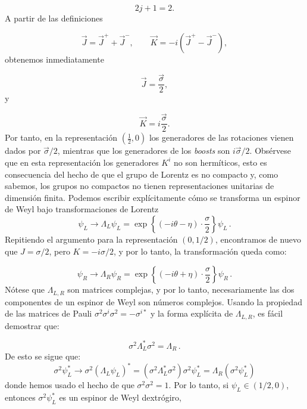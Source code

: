 \documentclass[a4paper,11pt]{book} %
\begin{document}
\begin{equation}
2j+1=2.
\end{equation}
\noindent
A partir de las definiciones

\begin{equation}
\vec J
=
\vec J^{+}
+
\vec J^{-},
\qquad
\vec K
=
-i\left(
\vec J^{+}
-
\vec J^{-}
\right),
\end{equation}
\noindent
obtenemos inmediatamente

\begin{equation}
\vec J
=
\frac{\vec{\sigma}}{2},
\end{equation}
\noindent
y

\begin{equation}
\vec K
=
i\frac{\vec{\sigma}}{2}.
\end{equation}
\noindent
Por tanto, en la representación
$\left(\frac{1}{2},0\right)$
los generadores de las rotaciones vienen dados por
$\vec{\sigma}/2$, mientras que los generadores de los
\textit{boosts} son $i\vec{\sigma}/2$.
\noindent
Obsérvese que en esta representación los generadores $K^i$ no son hermíticos, esto es consecuencia del hecho de
que el grupo de Lorentz es no compacto y, como sabemos, los grupos no compactos no tienen representaciones unitarias
de dimensión finita. 
\medskip\newline
Podemos escribir explícitamente cómo se transforma un espinor de
Weyl bajo transformaciones de Lorentz
\begin{equation}
\psi_L \to \Lambda_L \psi_L =
\exp\left\{ (-i\theta - \eta) \cdot \frac{\sigma}{2} \right\} \psi_L \, .
\end{equation}
 \noindent
Repitiendo el argumento para la representación $(0, 1/2)$, encontramos de nuevo que
$J = \sigma/2$, pero $K = -i\sigma/2$, y por lo tanto, la transformación queda como:
 
\begin{equation}
\psi_R \to \Lambda_R \psi_R =
\exp\left\{ (-i\theta + \eta) \cdot \frac{\sigma}{2} \right\} \psi_R \, .
\end{equation}
\noindent
Nótese que $\Lambda_{L,R}$ son matrices complejas, y por lo tanto, necesariamente
las dos componentes de un espinor de Weyl son números complejos.
\medskip\newline
Usando la propiedad de las matrices de Pauli $\sigma^2 \sigma^i \sigma^2 =
-\sigma^{i*}$ y la forma explícita de $\Lambda_{L,R}$, es fácil demostrar que:
 
\begin{equation}
\sigma^2 \Lambda_L^* \sigma^2 = \Lambda_R \, .
\end{equation}
\noindent
De esto se sigue que:
\begin{equation}
\sigma^2 \psi_L^* \to \sigma^2 (\Lambda_L \psi_L)^*
= (\sigma^2 \Lambda_L^* \sigma^2) \sigma^2 \psi_L^*
= \Lambda_R (\sigma^2 \psi_L^*)
\end{equation}
\noindent
donde hemos usado el hecho de que $\sigma^2 \sigma^2 = 1$. Por lo tanto, si
$\psi_L \in (1/2, 0)$, entonces $\sigma^2 \psi_L^*$ es un espinor de Weyl
dextrógiro,
 
\end{document}
